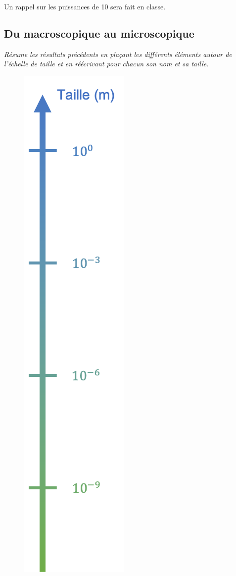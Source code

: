 \documentclass[12pt,a4paper]{article}
\begin{document}
\begin{conseil}
Un rappel sur les puissances de 10 sera fait en classe.
\end{conseil}

\subsection{Du macroscopique au microscopique}

\emph{Résume les résultats précédents en plaçant les différents éléments autour de l'échelle de taille et en réécrivant pour chacun son nom et sa taille.}

\begin{figure}[h!]
\center
\includegraphics[scale=1.25]{images/chap3_scales.png}
\end{figure}
\end{document}
